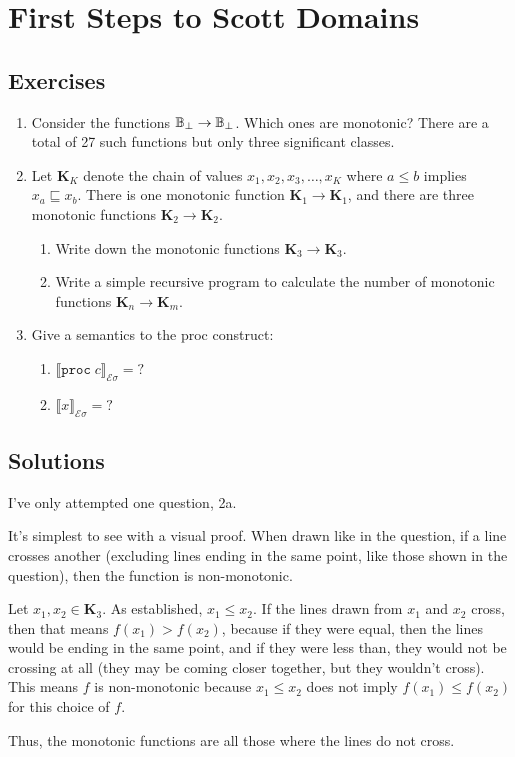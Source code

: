 \chapter{First Steps to Scott Domains}

\section{Exercises}

\begin{enumerate}
    \item Consider the functions $\operatorname{\mathbb{B}}_{\bot} \to \operatorname{\mathbb{B}}_{\bot}$.
    Which ones are monotonic?
    There are a total of 27 such functions but only three significant classes.

    \item Let $\mathbf{K}_K$ denote the chain of values $x_1, x_2, x_3, \dots , x_K$ where $a \leq b$ implies $x_a \sqsubseteq x_b$.
    There is one monotonic function $\mathbf{K}_1 \to \mathbf{K}_1$, and there are three monotonic functions $\mathbf{K}_2 \to \mathbf{K}_2$.
    \begin{enumerate}[label=\alph*)]
        \item Write down the monotonic functions $\mathbf{K}_3 \to \mathbf{K}_3$.

        \item Write a simple recursive program to calculate the number of monotonic functions $\mathbf{K}_n \to \mathbf{K}_m$.
    \end{enumerate}

    \item Give a semantics to the proc construct:
    \begin{enumerate}[label=\alph*)]
        \item $\llbracket \texttt{proc} \; c \rrbracket_{\mathcal{E} \sigma} = ?$
        \item $\llbracket x \rrbracket_{\mathcal{E} \sigma} = ?$
    \end{enumerate}
\end{enumerate}

\section{Solutions}

I've only attempted one question, 2a.

It's simplest to see with a visual proof. When drawn like in the question, if a line crosses another (excluding lines ending in the same point, like those shown in the question), then the function is non-monotonic.

Let $x_1, x_2 \in \mathbf{K}_3$. As established, $x_1 \leq x_2$. If the lines drawn from $x_1$ and $x_2$ cross, then that means $f(x_1) > f(x_2)$, because if they were equal, then the lines would be ending in the same point, and if they were less than, they would not be crossing at all (they may be coming closer together, but they wouldn't cross). This means $f$ is non-monotonic because $x_1 \leq x_2$ does not imply $f(x_1) \leq f(x_2)$ for this choice of $f$.

Thus, the monotonic functions are all those where the lines do not cross.
